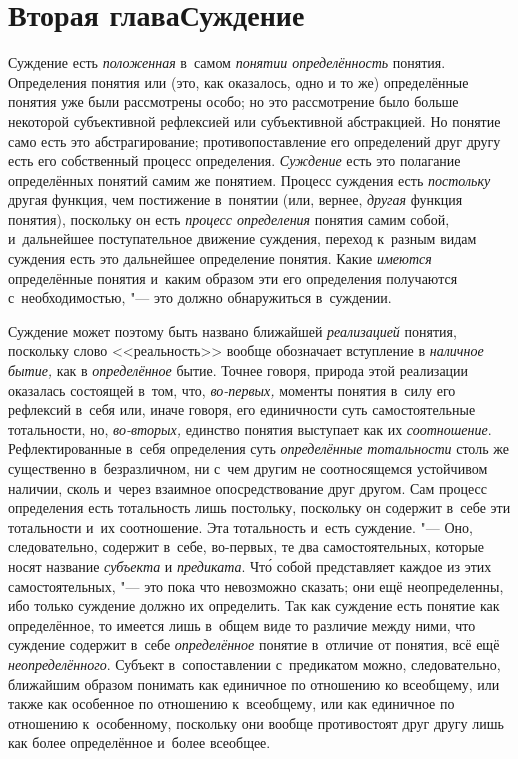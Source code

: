 \chapter[Вторая глава. Суждение]{Вторая глава\newline Суждение}

Суждение есть {\em положенная} в~самом {\em понятии определённость}
понятия. Определения понятия или (это, как оказалось, одно и
то же) определённые понятия уже были рассмотрены особо; но это рассмотрение
было больше некоторой субъективной рефлексией или субъективной абстракцией.
Но понятие само есть это абстрагирование; противопоставление его
определений друг другу есть его собственный процесс определения. {\em Суждение}
есть это полагание определённых понятий самим же понятием. Процесс суждения
есть {\em постольку} другая функция, чем постижение в~понятии (или, вернее,
{\em другая} функция понятия), поскольку он есть {\em процесс
определения} понятия самим собой, и~дальнейшее
поступательное движение суждения, переход к~разным видам
суждения есть это дальнейшее определение понятия. Какие {\em имеются}
определённые понятия и~каким образом эти его определения
получаются с~необходимостью, "--- это должно обнаружиться в~суждении.

Суждение может поэтому быть названо ближайшей {\em реализацией}
понятия, поскольку слово <<реальность>> вообще обозначает
вступление в {\em наличное бытие,} как в {\em определённое}
бытие. Точнее говоря, природа этой реализации оказалась
состоящей в~том, что, {\em во-первых,}
моменты понятия в~силу его рефлексий в~себя или, иначе
говоря, его единичности суть самостоятельные тотальности, но,
{\em во-вторых,} единство понятия выступает как их {\em соотношение}.
Рефлектированные в~себя определения суть {\em определённые тотальности}
столь же существенно в~безразличном, ни с~чем другим не
соотносящемся устойчивом наличии, сколь и~через взаимное опосредствование
друг другом. Сам процесс определения есть тотальность лишь постольку,
поскольку он содержит в~себе эти тотальности и~их соотношение. Эта
тотальность и~есть суждение. "--- Оно, следовательно, содержит
в~себе, во-первых, те два самостоятельных, которые носят название
{\em субъекта} и {\em предиката}. Чт\'{о}
собой представляет каждое из этих самостоятельных, "--- это
пока что невозможно сказать; они ещё неопределенны, ибо только суждение
должно их определить. Так как суждение есть понятие как определённое, то
имеется лишь в~общем виде то различие между ними, что суждение содержит
в~себе {\em определённое} понятие в~отличие от понятия, всё ещё
{\em неопределённого}. Субъект в~сопоставлении с~предикатом можно,
следовательно, ближайшим образом понимать как единичное по отношению ко
всеобщему, или также как особенное по отношению к~всеобщему, или как
единичное по отношению к~особенному, поскольку они вообще противостоят
друг другу лишь как более определённое и~более всеобщее.


